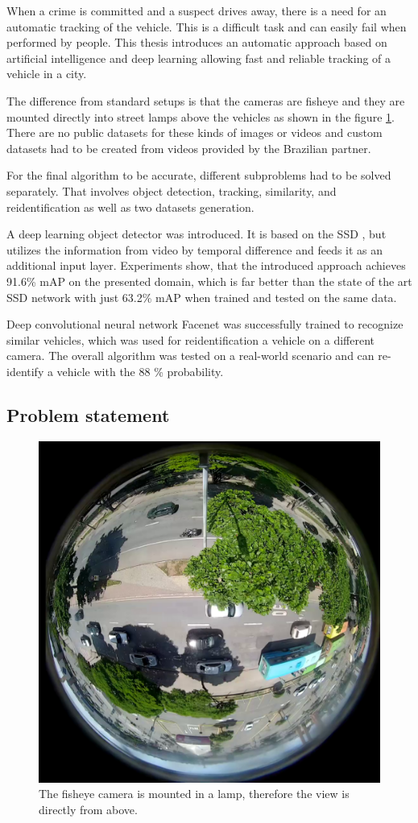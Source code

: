 \documentclass[a4paper,11pt,titlepage,twoside]{article}
\numberwithin{figure}{section}
\begin{document}
When a crime is committed and a suspect drives away, there is a need for an automatic tracking of the vehicle. This is a difficult task and can easily fail when performed by people. This thesis introduces an automatic approach based on artificial intelligence and deep learning allowing fast and reliable tracking of a vehicle in a city.

The difference from standard setups is that the cameras are fisheye and they are mounted directly into street lamps above the vehicles as shown in the figure \ref{fig:stream3}. There are no public datasets for these kinds of images or videos and custom datasets had to be created from videos provided by the Brazilian partner.

For the final algorithm to be accurate, different subproblems had to be solved separately. That involves object detection, tracking, similarity, and reidentification as well as two datasets generation.

A deep learning object detector was introduced. It is based on the SSD \cite{liu2016ssd}, but utilizes the information from video by temporal difference and feeds it as an additional input layer. Experiments show, that the introduced approach achieves 91.6\% mAP on the presented domain, which is far better than the state of the art SSD network with just 63.2\% mAP when trained and tested on the same data.

Deep convolutional neural network Facenet \cite{schroff2015facenet} was successfully trained to recognize similar vehicles, which was used for reidentification a vehicle on a different camera. The overall algorithm was tested on a real-world scenario and can re-identify a vehicle with the 88 \% probability.

\subsection{Problem statement}

\begin{figure}[h]
\centering
\includegraphics[width=0.7\linewidth]{fig/stream3.png}
\caption{The fisheye camera is mounted in a lamp, therefore the view is directly from above.}
\label{fig:stream3}
\end{figure}
\end{document}
